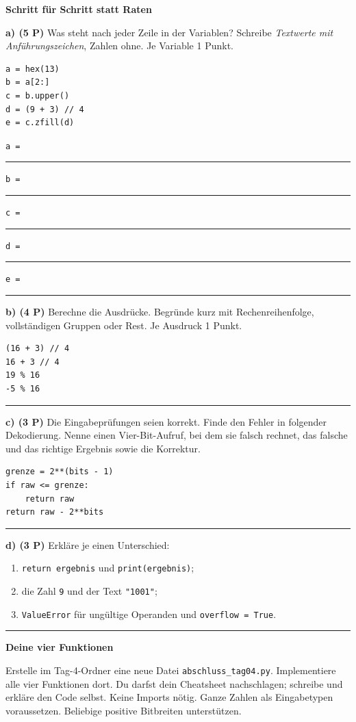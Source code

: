 \documentclass[10pt,a4paper]{article}
\newcommand{\titlepagepart}[2]{\vspace*{-4mm}{\sffamily\small #1}\par{\sffamily\LARGE\bfseries #2}\par\vspace{2mm}}
\newcommand{\block}[1]{\par\vspace{2mm}{\sffamily\large\bfseries #1}\par}
\newcommand{\code}[1]{\texttt{#1}}
\newcommand{\antwort}[1]{\par\vspace{#1}\hrule\vspace{2mm}}
\newcommand{\aufgabe}[2]{\block{#1 \hfill #2 Punkte}}
\begin{document}
\newpage
\titlepagepart{04 / PYTHON LESEN}{Schritt für Schritt statt Raten}
\aufgabe{5. Texte, Operatoren und Fehlersuche}{15}
\textbf{a) (5 P)} Was steht nach jeder Zeile in der Variablen? Schreibe
\emph{Textwerte mit Anführungszeichen}, Zahlen ohne. Je Variable 1 Punkt.
\begin{lstlisting}
a = hex(13)
b = a[2:]
c = b.upper()
d = (9 + 3) // 4
e = c.zfill(d)
\end{lstlisting}
\code{a =} \rule{28mm}{0.2pt}\quad\code{b =} \rule{28mm}{0.2pt}\quad
\code{c =} \rule{28mm}{0.2pt}\par
\code{d =} \rule{28mm}{0.2pt}\quad\code{e =} \rule{28mm}{0.2pt}

\textbf{b) (4 P)} Berechne die Ausdrücke. Begründe kurz mit Rechenreihenfolge,
vollständigen Gruppen oder Rest. Je Ausdruck 1 Punkt.
\begin{lstlisting}
(16 + 3) // 4
16 + 3 // 4
19 % 16
-5 % 16
\end{lstlisting}
\antwort{24mm}
\textbf{c) (3 P)} Die Eingabeprüfungen seien korrekt. Finde den Fehler in
folgender Dekodierung. Nenne einen Vier-Bit-Aufruf, bei dem sie falsch rechnet,
das falsche und das richtige Ergebnis sowie die Korrektur.
\begin{lstlisting}
grenze = 2**(bits - 1)
if raw <= grenze:
    return raw
return raw - 2**bits
\end{lstlisting}
\antwort{21mm}
\textbf{d) (3 P)} Erkläre je einen Unterschied:
\begin{enumerate}
\item \code{return ergebnis} und \code{print(ergebnis)};
\item die Zahl \code{9} und der Text \code{"1001"};
\item \code{ValueError} für ungültige Operanden und \code{overflow = True}.
\end{enumerate}
\antwort{20mm}

\newpage
\titlepagepart{05 / SELBST IMPLEMENTIEREN}{Deine vier Funktionen}
\aufgabe{6. Python-Praxisteil}{15}
Erstelle im Tag-4-Ordner eine neue Datei \code{abschluss\_tag04.py}.
Implementiere alle vier Funktionen dort. Du darfst dein Cheatsheet nachschlagen;
schreibe und erkläre den Code selbst. Keine Imports nötig. Ganze Zahlen als
Eingabetypen voraussetzen. Beliebige positive Bitbreiten unterstützen.
\end{document}
